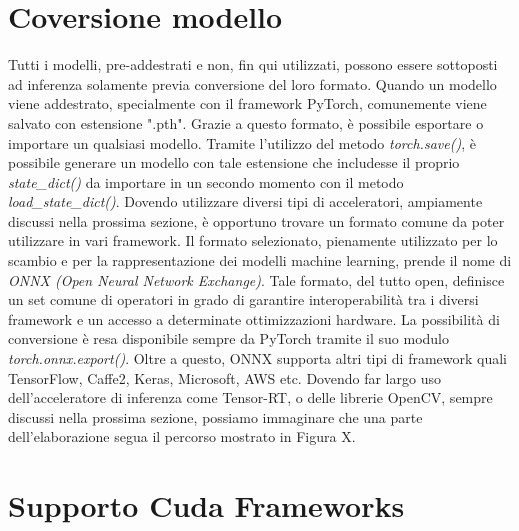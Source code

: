 \section{Coversione modello}
Tutti i modelli, pre-addestrati e non, fin qui utilizzati, possono essere sottoposti ad inferenza solamente previa conversione del loro formato. Quando un modello viene addestrato, specialmente con il framework PyTorch, comunemente viene salvato con estensione ".pth". Grazie a questo formato, è possibile esportare o importare un qualsiasi modello. Tramite l'utilizzo del metodo \emph{torch.save()}, è possibile generare un modello con tale estensione che includesse il proprio \emph{state\_dict()} da importare in un secondo momento con il metodo \emph{load\_state\_dict()}.
Dovendo utilizzare diversi tipi di acceleratori, ampiamente discussi nella prossima sezione, è opportuno trovare un formato comune da poter utilizzare in vari framework.  Il formato selezionato, pienamente utilizzato per lo scambio e per la rappresentazione dei modelli machine learning, prende il nome di \emph{ONNX (Open Neural Network Exchange)}.
Tale formato, del tutto open, definisce un set comune di operatori in grado di garantire interoperabilità tra i diversi framework e un accesso a determinate ottimizzazioni hardware.
La possibilità di conversione è resa disponibile sempre da PyTorch tramite il suo modulo \emph{torch.onnx.export()}.
Oltre a questo, ONNX supporta altri tipi di framework quali TensorFlow, Caffe2, Keras, Microsoft, AWS etc. Dovendo far largo uso dell'acceleratore di inferenza come Tensor-RT, o delle librerie OpenCV, sempre discussi nella prossima sezione, possiamo immaginare che una parte dell'elaborazione segua il percorso mostrato in Figura X.


\section{Supporto Cuda Frameworks}\label{acceleratori}
